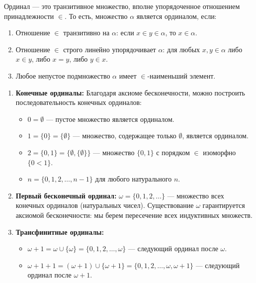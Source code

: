 \documentclass[11pt, a4paper]{extarticle}
\newcommand{\al}{\alpha}
\newcommand{\om}{\omega}
\begin{document}
\begin{definition}[Ординал]
Ординал — это транзитивное множество, вполне упорядоченное отношением принадлежности $\in$. То есть, множество $\al$ является ординалом, если:
\begin{enumerate}
    \item Отношение $\in$ транзитивно на $\al$: если $x \in y \in \al$, то $x \in \al$.
    \item Отношение $\in$ строго линейно упорядочивает $\al$: для любых $x, y \in \al$ либо $x \in y$, либо $x = y$, либо $y \in x$.
    \item Любое непустое подмножество $\al$ имеет $\in$-наименьший элемент.
\end{enumerate}
\end{definition}

\begin{example}\;
\begin{enumerate}
    \item \textbf{Конечные ординалы:} Благодаря аксиоме бесконечности, можно построить последовательность конечных ординалов:
    \begin{itemize}
        \item $0 = \emptyset$ — пустое множество является ординалом.
        \item $1 = \{0\} = \{\emptyset\}$ — множество, содержащее только $\emptyset$, является ординалом.
        \item $2 = \{0, 1\} = \{\emptyset, \{\emptyset\}\}$ — множество $\{0, 1\}$ с порядком $\in$ изоморфно $\{0 < 1\}$.
        \item $n = \{0, 1, 2, \dots, n-1\}$ для любого натурального $n$.
    \end{itemize}
    
    \item \textbf{Первый бесконечный ординал:} $\om = \{0, 1, 2, \dots\}$ — множество всех конечных ординалов (натуральных чисел). Существование $\om$ гарантируется аксиомой бесконечности: мы берем пересечение всех индуктивных множеств.
    
    \item \textbf{Трансфинитные ординалы:}
    \begin{itemize}
        \item $\om + 1 = \om \cup \{\om\} = \{0, 1, 2, \dots, \om\}$ — следующий ординал после $\om$.
        \item $\om + 1 + 1 = (\om + 1) \cup \{\om + 1\} = \{0, 1, 2, \dots, \om, \om + 1\}$ — следующий ординал после $\om + 1$.
    \end{itemize}
\end{enumerate}
\end{example}
\end{document}
